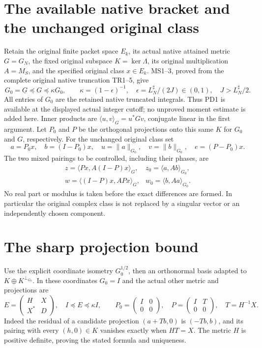 \documentclass[11pt]{article}
\begin{document}
\section{The available native bracket and the unchanged original class}
Retain the original finite packet space $E_k$, its actual native attained
metric $G=G_N$, the fixed original subspace $K=\ker\Lambda$, its original
multiplication $A=M_S$, and the specified original class $x\in E_k$.
MS1--3, proved from the complete original native truncation TR1--5, give
\[
 G_0=\underline G\preceq G\preceq\kappa G_0,\qquad
 \kappa=(1-\epsilon)^{-1},\quad
 \epsilon=L_N^\sharp/(2J)\in(0,1),\quad J>L_N^\sharp/2.          \tag{PD1}
\]
All entries of $G_0$ are the retained native truncated integrals.
Thus PD1 is available at the displayed actual integer cutoff; no
unproved moment estimate is added here.  Inner products are
$\langle u,v\rangle_G=u^*Gv$, conjugate linear in the first argument.
Let $P_0$ and $P$ be the orthogonal projections onto this same $K$
for $G_0$ and $G$, respectively.  For the unchanged original class set
\[
 a=P_0x,\quad b=(I-P_0)x,\quad
 u=\|a\|_{G_0},\quad v=\|b\|_{G_0},\quad
 e=(P-P_0)x.
                                                                    \tag{PD2}
\]
The two mixed pairings to be controlled, including their phases, are
\[
 \begin{array}{ll}
 z=\langle Px,A(I-P)x\rangle_G,
   &z_0=\langle a,Ab\rangle_{G_0},\\
 w=\langle(I-P)x,APx\rangle_G,
   &w_0=\langle b,Aa\rangle_{G_0}.
 \end{array}                                                       \tag{PD3}
\]
No real part or modulus is taken before the exact differences are
formed.  In particular the original complex class is not replaced
by a singular vector or an independently chosen component.

\section{The sharp projection bound}
Use the explicit coordinate isometry $G_0^{1/2}$, then an orthonormal
basis adapted to $K\oplus K^{\perp_{G_0}}$.  In these coordinates
$G_0=I$ and the actual other metric and projections are
\[
 E=\begin{pmatrix}H&X\\X^*&D\end{pmatrix},\quad I\preceq E\preceq\kappa I,
 \qquad P_0=\begin{pmatrix}I&0\\0&0\end{pmatrix},\quad
 P=\begin{pmatrix}I&T\\0&0\end{pmatrix},\quad T=H^{-1}X.          \tag{PD4}
\]
Indeed the residual of a candidate projection $(a+Tb,0)$ is
$(-Tb,b)$, and its pairing with every $(h,0)\in K$ vanishes exactly
when $HT=X$.  The metric $H$ is positive definite, proving the
stated formula and uniqueness.
\end{document}
